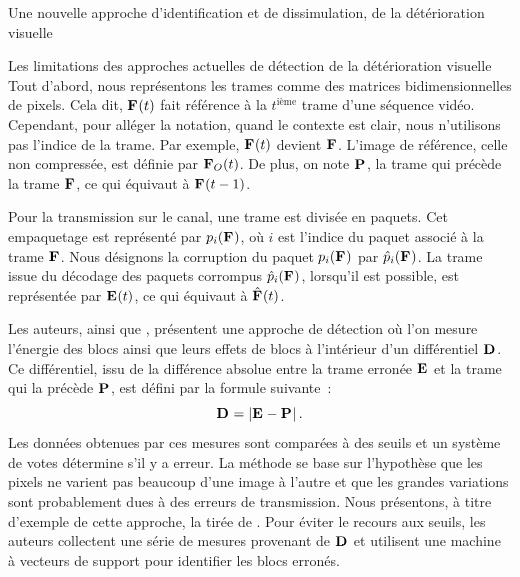 \begin{chapter}{Une nouvelle approche d'identification et de dissimulation, de
la détérioration visuelle}
\begin{section}{Les limitations des approches actuelles de détection de la
détérioration visuelle}
Tout d'abord, nous représentons les trames comme des matrices bidimensionnelles
de pixels. Cela dit, $\mathbf{F}_{}(t)$ fait référence à la $t^{\text{ième}}$ trame
d'une séquence vidéo. Cependant, pour alléger la notation, quand le contexte est
clair, nous n'utilisons pas l'indice de la trame. Par exemple, $\mathbf{F}_{}(t)$
devient $\mathbf{F}_{}$. L'image de référence, celle non compressée, est définie par
$\mathbf{F}_{O}(t)$. De plus, on note $\mathbf{P}_{}$, la trame qui précède la trame $\mathbf{F}_{}$,
ce qui équivaut à $\mathbf{F}_{}(t-1)$.

Pour la transmission sur le canal, une trame est divisée en paquets. Cet
empaquetage est représenté par $p_i(\mathbf{F}_{})$, où $i$ est l'indice du paquet
associé à la trame $\mathbf{F}_{}$. Nous désignons la corruption du paquet
$p_i(\mathbf{F}_{})$ par $\hat{p}_i(\mathbf{F}_{})$. La trame issue du décodage des paquets
corrompus $\hat{p}_i(\mathbf{F}_{})$, lorsqu'il est possible, est représentée
par $\mathbf{E}_{}(t)$, ce qui équivaut à $\hat{\mathbf{F}_{}}(t)$.

Les auteurs, \citet{Superiori2007} ainsi que \citet{Ikuno2007}, présentent une
approche de détection où l'on mesure l'énergie des blocs ainsi que leurs effets
de blocs à l'intérieur d'un différentiel $\mathbf{D}_{}$. Ce différentiel, issu de la
différence absolue entre la trame erronée $\mathbf{E}_{}$ et la trame qui la précède
$\mathbf{P}_{}$, est défini par la formule suivante~:
\begin{equation}
\mathbf{D}_{} = \left| \mathbf{E}_{} - \mathbf{P}_{} \right|.
\end{equation}
Les données obtenues par ces mesures sont comparées à des seuils et un système
de votes détermine s'il y a erreur. La méthode se base sur l'hypothèse que les
pixels ne varient pas beaucoup d'une image à l'autre et que les grandes
variations sont probablement dues à des erreurs de transmission. Nous
présentons, à titre d'exemple de cette approche, la  tirée de
\citet[p.~25]{Ikuno2007}. Pour éviter le recours aux seuils, les auteurs
\citet{Farrugia2008} collectent une série de mesures provenant de $\mathbf{D}_{}$ et
utilisent une machine à vecteurs de support \citep{SVM1995} pour identifier les
blocs erronés.


\end{section}
\end{chapter}

